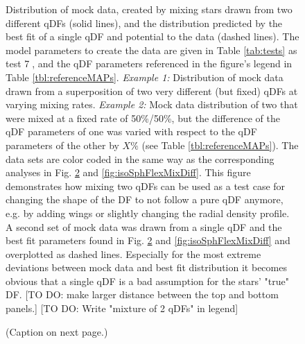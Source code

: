 \begin{figure}
\caption{Distribution of mock data, created by mixing stars drawn from two different qDFs (solid lines), and the distribution predicted by the best fit of a single qDF and potential to the data (dashed lines). The model parameters to create the data are given in Table \ref{tab:tests} as test \textcircled{7}, and the qDF parameters referenced in the figure's legend in Table \ref{tbl:referenceMAPs}. \emph{Example 1:} Distribution of mock data drawn from a superposition of two very different (but fixed) qDFs at varying mixing rates. \emph{Example 2:} Mock data distribution of two \MAPs that were mixed at a fixed rate of 50\%/50\%, but the difference of the qDF parameters of one \MAP was varied with respect to the qDF parameters of the other \MAP by $X\%$ (see Table \ref{tbl:referenceMAPs}). The data sets are color coded in the same way as the corresponding analyses in Fig.  \ref{fig:isoSphFlexMixCont} and \ref{fig:isoSphFlexMixDiff}. This figure demonstrates how mixing two qDFs can be used as a test case for changing the shape of the DF to not follow a pure qDF anymore, e.g. by adding wings or slightly changing the radial density profile. A second set of mock data was drawn from a single qDF and the best fit parameters found in Fig.  \ref{fig:isoSphFlexMixCont} and \ref{fig:isoSphFlexMixDiff} and overplotted as dashed lines. Especially for the most extreme deviations between mock data and best fit distribution it becomes obvious that a single qDF is a bad assumption for the stars' "true" DF. [TO DO: make larger distance between the top and bottom panels.] [TO DO: Write "mixture of 2 qDFs" in legend]}
\label{fig:isoSphFlexMix_mockdata_residuals}
\end{figure}



\begin{figure}
\caption{(Caption on next page.)}
\label{fig:isoSphFlexMixCont}
\end{figure}

